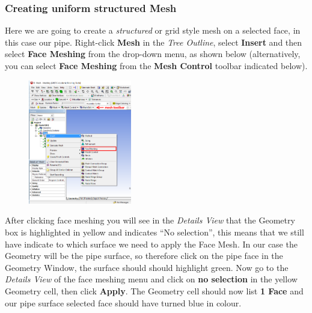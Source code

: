 \documentclass[11pt,a4paper,oneside,hidelinks]{scrartcl}
\newcommand\bfr[1]{\textcolor[rgb]{1,0.00,0.00}{\textbf{\textsf{#1}}}}
\begin{document}
\subsubsection{Creating uniform structured Mesh}
Here we are going to create a \emph{structured} or grid style mesh on a selected face, in this case our pipe. Right-click \bfr{Mesh} in the \emph{Tree Outline}, select \bfr{Insert} and then select \bfr{Face Meshing} from the drop-down menu, as shown below (alternatively, you can select \bfr{Face Meshing} from the \bfr{Mesh Control} toolbar indicated below).

\begin{figure}[H]
\begin{center}
\includegraphics[width=0.4\textwidth,clip]{face_meshing.png}
\end{center}
\end{figure}

After clicking face meshing you will see in the \emph{Details View} that the Geometry box is highlighted in yellow and indicates ``No selection'', this means that we still have indicate to which surface we need to apply the Face Mesh. In our case the Geometry will be the pipe surface, so therefore click on the pipe face in the Geometry Window, the surface should should highlight green. Now go to the \emph{Details View} of the face meshing menu and click on \bfr{no selection} in the yellow Geometry cell, then click \bfr{Apply}. The Geometry cell should now list \bfr{1 Face} and our pipe surface selected face should have turned blue in colour.
\end{document}
